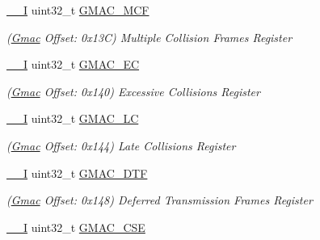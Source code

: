 \begin{DoxyCompactItemize}
\mbox{\hyperlink{core__cm7_8h_af63697ed9952cc71e1225efe205f6cd3}{\+\_\+\+\_\+I}} uint32\+\_\+t \mbox{\hyperlink{structGmac_a065024165993ba2242abcb9826b86aaf}{G\+M\+A\+C\+\_\+\+M\+CF}}
\begin{DoxyCompactList}\small\item\em (\mbox{\hyperlink{structGmac}{Gmac}} Offset\+: 0x13C) Multiple Collision Frames Register \end{DoxyCompactList}\item 
\mbox{\label{structGmac_a2908633b987115091072731cac04a512}} 
\mbox{\hyperlink{core__cm7_8h_af63697ed9952cc71e1225efe205f6cd3}{\+\_\+\+\_\+I}} uint32\+\_\+t \mbox{\hyperlink{structGmac_a2908633b987115091072731cac04a512}{G\+M\+A\+C\+\_\+\+EC}}
\begin{DoxyCompactList}\small\item\em (\mbox{\hyperlink{structGmac}{Gmac}} Offset\+: 0x140) Excessive Collisions Register \end{DoxyCompactList}\item 
\mbox{\label{structGmac_af508ece4f3527d5737a21de5e98da851}} 
\mbox{\hyperlink{core__cm7_8h_af63697ed9952cc71e1225efe205f6cd3}{\+\_\+\+\_\+I}} uint32\+\_\+t \mbox{\hyperlink{structGmac_af508ece4f3527d5737a21de5e98da851}{G\+M\+A\+C\+\_\+\+LC}}
\begin{DoxyCompactList}\small\item\em (\mbox{\hyperlink{structGmac}{Gmac}} Offset\+: 0x144) Late Collisions Register \end{DoxyCompactList}\item 
\mbox{\label{structGmac_a97be71201ca2209837ea0d19811f692b}} 
\mbox{\hyperlink{core__cm7_8h_af63697ed9952cc71e1225efe205f6cd3}{\+\_\+\+\_\+I}} uint32\+\_\+t \mbox{\hyperlink{structGmac_a97be71201ca2209837ea0d19811f692b}{G\+M\+A\+C\+\_\+\+D\+TF}}
\begin{DoxyCompactList}\small\item\em (\mbox{\hyperlink{structGmac}{Gmac}} Offset\+: 0x148) Deferred Transmission Frames Register \end{DoxyCompactList}\item 
\mbox{\label{structGmac_a5df7a2e705b3c75de46dc218ece661a4}} 
\mbox{\hyperlink{core__cm7_8h_af63697ed9952cc71e1225efe205f6cd3}{\+\_\+\+\_\+I}} uint32\+\_\+t \mbox{\hyperlink{structGmac_a5df7a2e705b3c75de46dc218ece661a4}{G\+M\+A\+C\+\_\+\+C\+SE}}

\end{DoxyCompactItemize}
